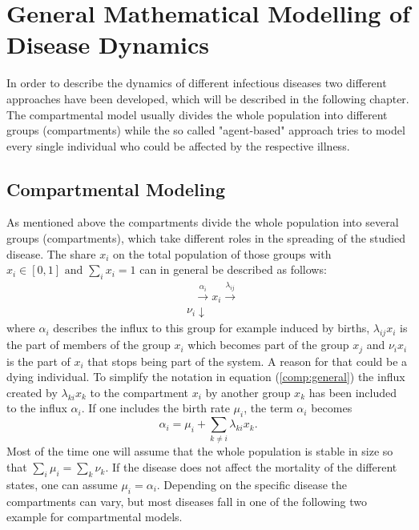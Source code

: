 \section{General Mathematical Modelling of Disease Dynamics}
\label{chap:generalModeling}
In order to describe the dynamics of different infectious diseases two different approaches have been developed, which will be described in the following chapter.
The compartmental model usually divides the whole population into different groups (compartments) while the so called "agent-based" approach tries to model every single individual who could be affected by the respective illness. 
\subsection{Compartmental Modeling}
As mentioned above the compartments divide the whole population into several groups (compartments), which take different roles in the spreading of the studied disease.
The share $x_i$ on the total population of those groups with $x_i \in [0,1] \text{ and } \sum_i x_i =1 $ can in general be described as follows:
\begin{eqnarray}
&\text{     }\xrightarrow{\alpha_i}  x_i \xrightarrow{\lambda_{ij}}   \label{comp:general} \\
&{\nu_i} \downarrow  \nonumber
\end{eqnarray}
where $\alpha_i$ describes the influx to this group for example induced by births, $\lambda_{ij} x_i$ is the part of members of the group $x_i$ which becomes part of the group $x_j$ and $\nu_i x_i$ is the part of $x_i$ that stops being part of the system. A reason for that could be a dying individual. To simplify the notation in equation (\ref{comp:general}) the influx created by $\lambda_{ki} x_k$ to the compartment $x_i$ by another group $x_k$ has been included to the influx $\alpha_i$. If one includes the birth rate $\mu_i$, the term $\alpha_i$ becomes 
\begin{equation}
\alpha_i = \mu_i + \sum_{k\neq i}{}\lambda_{ki} x_k.
\end{equation}
Most of the time one will assume that the whole population is stable in size so that $\sum_i \mu_i = \sum_{k} \nu_k$. If the disease does not affect the mortality of the different states, one can assume $\mu_i = \alpha_i$.
Depending on the specific disease the compartments can vary, but most diseases fall in one of the following two example for compartmental models.
